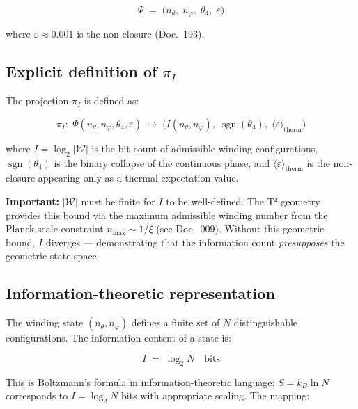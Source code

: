 \begin{equation}
  \Psi \;=\; \bigl(n_\theta,\; n_\varphi,\; \theta_4,\; \varepsilon\bigr)
  \tag{243.1}
\end{equation}

where $\varepsilon \approx 0.001$ is the non-closure (Doc.~193).

\subsection{\texorpdfstring{Explicit definition of $\pi_I$}{Explicit definition of pi\_I}}

The projection $\pi_I$ is defined as:

\begin{equation}
  \pi_I:\; \Psi(n_\theta, n_\varphi, \theta_4, \varepsilon)
  \;\longmapsto\;
  \bigl(I(n_\theta, n_\varphi),\;\operatorname{sgn}(\theta_4),\;
        \langle\varepsilon\rangle_\text{therm}\bigr)
  \tag{243.2a}
\end{equation}

where $I = \log_2|\mathcal{W}|$ is the bit count of admissible winding
configurations, $\operatorname{sgn}(\theta_4)$ is the binary collapse
of the continuous phase, and $\langle\varepsilon\rangle_\text{therm}$
is the non-closure appearing only as a thermal expectation value.

\textbf{Important:} $|\mathcal{W}|$ must be finite for $I$ to be
well-defined. The T⁴ geometry provides this bound via the maximum
admissible winding number from the Planck-scale constraint
$n_\text{max} \sim 1/\xi$ (see Doc.~009). Without this geometric
bound, $I$ diverges --- demonstrating that the information count
\emph{presupposes} the geometric state space.

\subsection{Information-theoretic representation}

The winding state $(n_\theta, n_\varphi)$ defines a finite set of $N$
distinguishable configurations. The information content of a state is:

\begin{equation}
  I \;=\; \log_2 N \quad \text{bits}
  \tag{243.2}
\end{equation}

This is Boltzmann's formula in information-theoretic language:
$S = k_B \ln N$ corresponds to $I = \log_2 N$ bits with appropriate
scaling. The mapping:

